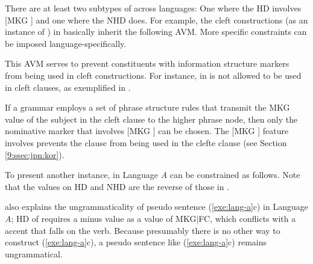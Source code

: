 There are at least two subtypes of  across languages:
One where the HD involves [MKG ] and one where the NHD does.
For example, the cleft constructions (as an instance of
) in  basically inherit the following
AVM. More specific constraints can be imposed
language-specifically.


\noindent This AVM serves to prevent constituents with information
structure markers from being used in cleft constructions. For
instance, \nun in  is not allowed to be used in cleft
clauses, as exemplified in .



\noindent If a grammar employs a set of phrase structure rules that
transmit the MKG value of the subject in the cleft clause to the
higher phrase node, then only the nominative marker that involves [MKG
  ] can be chosen.  The [MKG ] feature \nun
involves prevents the clause from being used in the clefte clause (see
Section \ref{9:ssec:jpn:kor}).


To present another instance,  in Language \textit{A}
can be constrained as follows. Note that the values on HD and NHD are
the reverse of those in .


\noindent {} also explains the ungrammaticality
of pseudo sentence (\ref{exe:lang-a}c) in Language \textit{A}; HD of
 requires a minus value as a value of MKG{$\mid$}FC,
which conflicts with a  accent that falls on the verb. Because
presumably there is no other way to construct (\ref{exe:lang-a}c), a
pseudo sentence like (\ref{exe:lang-a}c) remains ungrammatical.

